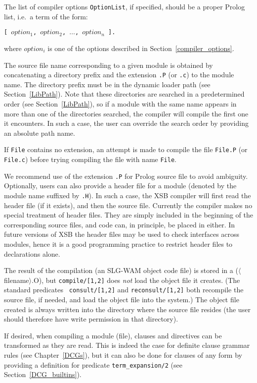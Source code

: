 The list of compiler options {\tt OptionList}, if specified, 
should be a proper Prolog list, i.e.\ a term of the form:
\begin{center}
	{\tt [ $option_1$, $option_2$, $\ldots$, $option_n$ ].}
\end{center}
where $option_i$ is one of the options described in
Section~\ref{compiler_options}.

The source file name corresponding to a given module is obtained by 
concatenating a directory prefix and the extension {\tt .P} (or {\tt .c}) 
to the module name.  The directory prefix must be in the
dynamic loader path (see Section~\ref{LibPath}).
Note that these directories are searched in a predetermined
order (see Section~\ref{LibPath}), so if a module with the same name
appears in more than one of the directories searched, the compiler 
will compile the first one it encounters.  In such a case, the user can 
override the search order by providing an absolute path name.

If {\tt File} contains no extension, an attempt is made to compile the 
file {\tt File.P} (or {\tt File.c}) before trying compiling the file 
with name {\tt File}.  

We recommend use of the extension {\tt .P} for Prolog source file to
avoid ambiguity.  Optionally, users can also provide a header file for
a module (denoted by the module name suffixed by {\tt .H}).  In such a
case, the XSB compiler will first read the header file (if it
exists), and then the source file.  Currently the compiler makes no
special treatment of header files.  They are simply included in the
beginning of the corresponding source files, and code can, in
principle, be placed in either.  In future versions of XSB the
header files may be used to check interfaces across modules, hence it
is a good programming practice to restrict header files to
declarations alone.
 
The result of the compilation (an SLG-WAM object code file) is stored
in a ($\langle$filename$\rangle$.O), but {\tt compile/[1,2]} does {\em
not\/} load the object file it creates.  (The standard predicates {\tt
consult/[1,2]} and {\tt reconsult/[1,2]} both recompile the source
file, if needed, and load the object file into the system.)  The
object file created is always written into the directory where the
source file resides (the user should therefore have write permission
in that directory).
 
If desired, when compiling a module (file), clauses and directives can be
transformed as they are read.  This is indeed the case for definite clause
grammar rules (see Chapter~\ref{DCGs}), but it can also be done for clauses
of any form by providing a definition for predicate {\tt term\_expansion/2}
(see Section~\ref{DCG_builtins}).

